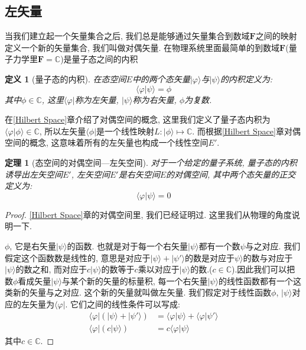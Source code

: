 \documentclass[a4paper,11pt]{book}
\newtheorem{definition}{\hspace{2em}定义}[section]
\newtheorem{theorem}{\hspace{2em}定理}[section]
\newtheorem{proof}{证明}[section]
\begin{document}
\subsection{左矢量}
当我们建立起一个矢量集合之后, 我们总是能够通过矢量集合到数域$\mathbf{F}$之间的映射定义一个新的矢量集合, 我们叫做对偶矢量. 在物理系统里面最简单的到数域$\mathbf{F}$(量子力学里$\mathbf{F}=\mathbb{C}$)是量子态之间的内积
\begin{definition}[量子态的内积]
  在态空间$E$中的两个态矢量$|\varphi\rangle$与$|\psi\rangle$的内积定义为:
\begin{equation*}
  \langle\varphi|\psi\rangle=\phi
\end{equation*}
其中$\phi\in\mathbb{C}$, 这里$\langle\varphi|$称为左矢量, $|\psi\rangle$称为右矢量, $\phi$为复数.
\end{definition}
在\ref{Hilbert Space}章介绍了对偶空间的概念, 这里我们定义了量子态内积为$\langle\varphi|\phi\rangle\in\mathbb{C}$, 所以左矢量$\langle\phi|$是一个线性映射$L:|\phi\rangle\longmapsto\mathbb{C}$. 而根据\ref{Hilbert Space}章对偶空间的概念, 这意味着所有的左矢量也构成一个线性空间$E'$.
\begin{theorem}[态空间的对偶空间---左矢空间]
  对于一个给定的量子系统, 量子态的内积诱导出左矢空间$E'$, 左矢空间$E'$是右矢空间$E$的对偶空间, 其中两个态矢量的正交定义为:
\begin{equation*}
  \langle\varphi|\psi\rangle=0
\end{equation*}
\end{theorem}
\begin{proof}
\ref{Hilbert Space}章的对偶空间里, 我们已经证明过. 这里我们从物理的角度说明一下.

$\phi$, 它是右矢量$|\psi\rangle$的函数. 也就是对于每一个右矢量$|\psi\rangle$都有一个数$\psi$与之对应. 我们假定这个函数数是线性的, 意思是对应于$|\psi\rangle+|\psi'\rangle$的数是对应于$\psi\rangle$的数与对应于$|\psi\rangle$的数之和, 而对应于$c|\psi\rangle$的数等于$c$乘以对应于$|\psi\rangle$的数.($c\in\mathbb{C}$).因此我们可以把数$\phi$看成矢量$|\psi\rangle$与某个新的矢量的标量积, 每一个右矢量$|\psi\rangle$的线性函数都有一个这类新的矢量与之对应. 这个新的矢量就叫做左矢量. 我们假定对于线性函数$\phi$, $|\psi\rangle$对应的左矢量为$\langle\varphi|$. 它们之间的线性条件可以写成:
\begin{equation}\label{leftvec add 1}
  \begin{split}
     \langle\varphi|(|\psi\rangle+|\psi'\rangle)&=\langle\varphi|\psi\rangle+\langle\varphi|\psi'\rangle \\
     \langle\varphi|(c|\psi\rangle)&=c\langle\varphi|\psi\rangle
  \end{split}
\end{equation}
其中$c\in\mathbb{C}$.
\end{proof}
\end{document}

